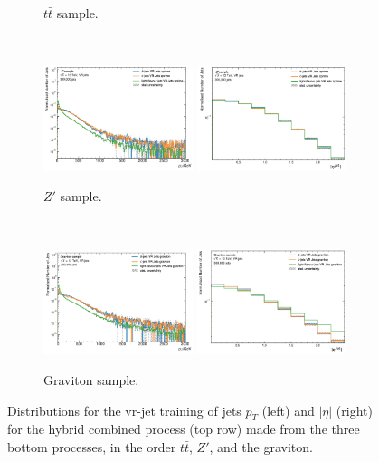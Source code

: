 \begin{figure}[h!]
\begin{subfigure}[b]{0.98\textwidth}
      \caption{$t\bar{t}$ sample.} 
      \label{apfig:vrjetdistt}
  \end{subfigure}\\
  \begin{subfigure}[b]{0.98\textwidth}
      \centering
      \includegraphics[width=0.48\textwidth]{Images/FTAG/VRDips/JetDist/zppt.png}
      \includegraphics[width=0.48\textwidth]{Images/FTAG/VRDips/JetDist/zpeta.png}
      \caption{$Z'$ sample.} 
      \label{apfig:vrjetdiszp}
  \end{subfigure}\\
  \begin{subfigure}[b]{0.98\textwidth}
      \centering
      \includegraphics[width=0.48\textwidth]{Images/FTAG/VRDips/JetDist/grpt.png}
      \includegraphics[width=0.48\textwidth]{Images/FTAG/VRDips/JetDist/greta.png}
      \caption{Graviton sample.} 
      \label{apfig:vrjetdisgr}
  \end{subfigure}
  \caption{Distributions for the \gls{vr}-jet training of jets $p_T$ (left) and $|\eta|$ (right) for the hybrid combined process (top row) made from the three bottom processes, in the order $t\bar{t}$, $Z'$, and the graviton.}
  \label{apfig:vrjetdist}
\end{figure} 

